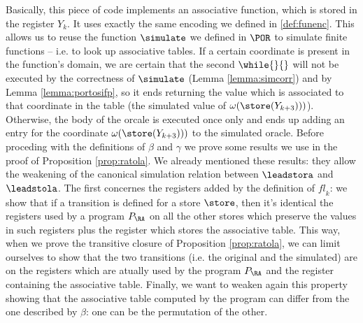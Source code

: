 Basically, this piece of code implements an associative function, which is stored
in the register $Y_k$. It uses exactly the same encoding we defined in \ref{def:funenc}.
This allows us to reuse the function $\simulate$
we defined in $\POR$ to simulate finite functions -- i.e. to look up associative tables.
If a certain coordinate is present in the function's domain, we are certain that
the second $\while {}{}$ will not be executed by the correctness
of $\simulate$ (Lemma \ref{lemma:simcorr}) and by Lemma \ref{lemma:portosifp},
so it ends returning the value which is associated to that coordinate in the table
(the simulated value of $\omega (\store(Y_{k+3})))$). Otherwise, the body of the
orcale is executed once only and ends up adding an entry for the coordinate
$\omega (\store(Y_{k+3})))$ to the simulated oracle.
%
Before proceding with the definitions of $\beta$ and $\gamma$ we prove some results
we use in the proof of Proposition \ref{prop:ratola}. We already mentioned these
results: they allow the weakening of the canonical simulation relation between
$\leadstora$ and $\leadstola$. The first concernes the
registers added by the definition of $\mathit{fl}_k$: we show that if a transition is defined
for a store $\store$, then it's identical the registers used by a program $P_\RA$
on all the other stores which preserve the values in such registers plus
the register which stores the associative table. This way,
when we prove the transitive closure of Proposition \ref{prop:ratola},
we can limit ourselves to show that the two transitions (i.e. the original and the simulated)
are on the registers which are atually used by the program $P_\RA$ and the register
containing the associative table. Finally, we want to weaken again this property
showing that the associative table computed by the program can differ
from the one described by $\beta$: one can be the permutation of the other.


